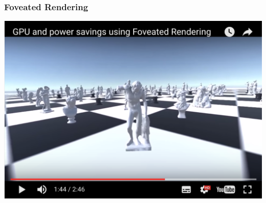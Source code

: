 \begin{frame}
	\frametitle{Foveated Rendering}
	\begin{center}
		\href{https://www.youtube.com/watch?v=6q3w0fiD0zg}{ \includegraphics[scale=.4]{assets/foveated-rendering}  }
	\end{center}
\end{frame}


